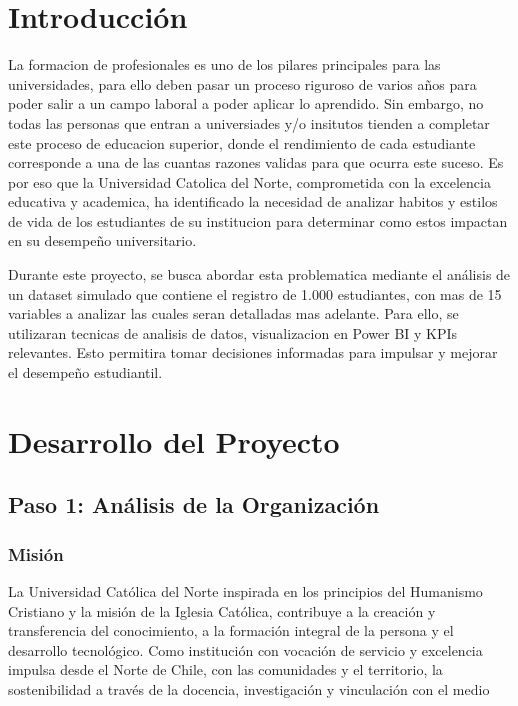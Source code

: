 \documentclass[12pt,letterpaper]{report}
\begin{document}
\chapter*{Introducción}

La formacion de profesionales es uno de los pilares principales para las universidades, para ello deben pasar un proceso riguroso de varios años para poder salir a un campo laboral a poder aplicar lo aprendido. Sin embargo, no todas las personas que entran a universiades y/o insitutos tienden a completar este proceso de educacion superior, donde el rendimiento de cada estudiante corresponde a una de las cuantas razones validas para que ocurra este suceso. Es por eso que la Universidad Catolica del Norte, comprometida con la excelencia educativa y academica, ha identificado la necesidad de analizar habitos y estilos de vida de los estudiantes de su institucion para determinar como estos impactan en su desempeño universitario.

Durante este proyecto, se busca abordar esta problematica mediante el análisis de un dataset simulado que contiene el registro de 1.000 estudiantes, con mas de 15 variables a analizar las cuales seran detalladas mas adelante. Para ello, se utilizaran tecnicas de analisis de datos, visualizacion en Power BI y KPIs relevantes. Esto permitira tomar decisiones informadas para impulsar y mejorar el desempeño estudiantil.

\newpage

\chapter{Desarrollo del Proyecto}

\section{Paso 1: Análisis de la Organización}

\subsection{Misión}
La Universidad Católica del Norte inspirada en los principios del Humanismo Cristiano y la misión de la Iglesia Católica, contribuye a la creación y transferencia del conocimiento, a la formación integral de la persona y el desarrollo tecnológico. Como institución con vocación de servicio y excelencia impulsa desde el Norte de Chile, con las comunidades y el territorio, la sostenibilidad a través de la docencia, investigación y vinculación con el medio
\end{document}
